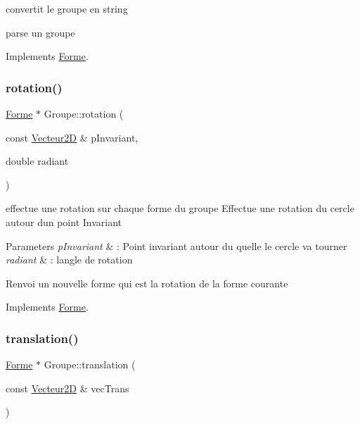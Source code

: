 convertit le groupe en string 

parse un groupe 

Implements \mbox{\hyperlink{class_forme}{Forme}}.

\mbox{\label{class_groupe_a63a6fa7250c34731dc8166640b223de1}} 
\subsubsection{\texorpdfstring{rotation()}{rotation()}}
{\footnotesize\ttfamily \mbox{\hyperlink{class_forme}{Forme}} $\ast$ Groupe\+::rotation (\begin{DoxyParamCaption}\item[{const \mbox{\hyperlink{class_vecteur2_d}{Vecteur2D}} \&}]{p\+Invariant,  }\item[{double}]{radiant }\end{DoxyParamCaption})\hspace{0.3cm}{\ttfamily [virtual]}}



effectue une rotation sur chaque forme du groupe Effectue une rotation du cercle autour d\textquotesingle{}un point Invariant 


\begin{DoxyParams}{Parameters}
{\em p\+Invariant} & \+: Point invariant autour du quelle le cercle va tourner \\
\hline
{\em radiant} & \+: l\textquotesingle{}angle de rotation\\
\hline
\end{DoxyParams}
Renvoi un nouvelle forme qui est la rotation de la forme courante 

Implements \mbox{\hyperlink{class_forme}{Forme}}.

\mbox{\label{class_groupe_af4708ce13fbcc867aec3f027663f676c}} 
\subsubsection{\texorpdfstring{translation()}{translation()}}
{\footnotesize\ttfamily \mbox{\hyperlink{class_forme}{Forme}} $\ast$ Groupe\+::translation (\begin{DoxyParamCaption}\item[{const \mbox{\hyperlink{class_vecteur2_d}{Vecteur2D}} \&}]{vec\+Trans }\end{DoxyParamCaption})\hspace{0.3cm}{\ttfamily [virtual]}}



